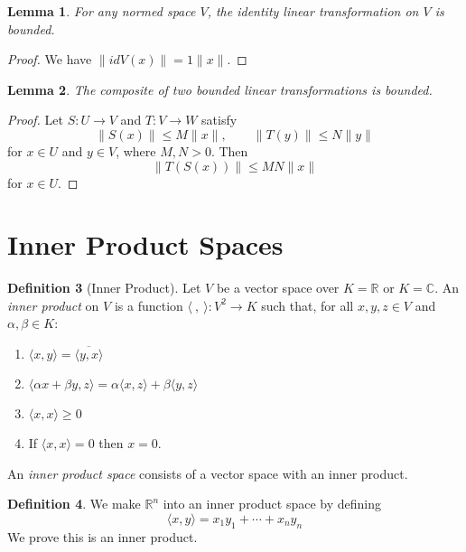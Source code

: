 \documentclass{book}
\newtheorem{lm}{Lemma}[chapter]
\theoremstyle{definition}
\newtheorem{df}[lm]{Definition}
\begin{document}
  \begin{lm}
    For any normed space $V$, the identity linear transformation on $V$ is
    bounded.
  \end{lm}
  
  \begin{proof}
    We have $\| id{V}(x) \| = 1 \| x \|$.
  \end{proof}
  
  \begin{lm}
    The composite of two bounded linear transformations is bounded.
  \end{lm}
  
  \begin{proof}
    Let $S : U \rightarrow V$ and $T : V \rightarrow W$ satisfy
    \[ \| S(x) \| \leq M \| x \|, \qquad \| T(y) \| \leq N \| y \| \]
    for $x \in U$ and $y \in V$, where $M, N > 0$. Then
    \[ \| T(S(x)) \| \leq MN \| x \| \]
    for $x \in U$.
  \end{proof}
  
  \section{Inner Product Spaces}
  
  \begin{df}[Inner Product]
    Let $V$ be a vector space over $K = \mathbb{R}$ or $K = \mathbb{C}$. An 
    \emph{inner product} on $V$ is
    a function $\langle \ , \ \rangle : V^2 \rightarrow K$ such that, for
    all $x,y,z \in V$ and $\alpha, \beta \in K$:
    \begin{enumerate}
      \item $\langle x,y \rangle = \overline{\langle y,x \rangle}$
      \item $\langle \alpha x + \beta y, z \rangle = \alpha \langle x,z \rangle 
      +
      \beta \langle y, z \rangle$
      \item $\langle x,x \rangle \geq 0$
      \item If $\langle x,x \rangle = 0$ then $x = 0$.
    \end{enumerate}
    An \emph{inner product space} consists of a vector space with an inner
    product.
  \end{df}
  
  \begin{df}
    We make $\mathbb{R}^n$ into an inner product space by defining
    \[ \langle x, y \rangle = x_1 y_1 + \cdots + x_n y_n \]
    We prove this is an inner product.
  \end{df}
  
\end{document}
